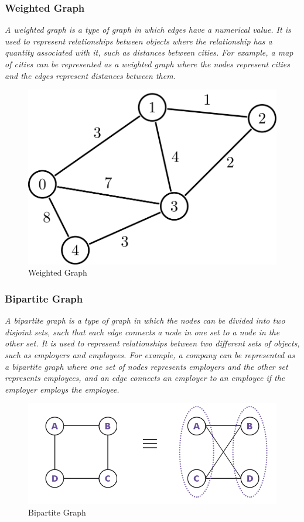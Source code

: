 \documentclass[11pt]{article}
\begin{document}
\subsubsection{Weighted Graph}

\textit{A weighted graph is a type of graph in which edges have a numerical value. It is used to represent relationships between objects where the relationship has a quantity associated with it, such as distances between cities. For example, a map of cities can be represented as a weighted graph where the nodes represent cities and the edges represent distances between them.}

\begin{figure}[H]
    \centering
    \includegraphics[width=.45\textwidth]{figures/weighted graph.png}
    \caption{Weighted Graph}
\end{figure}


\subsubsection{Bipartite Graph}

\textit{A bipartite graph is a type of graph in which the nodes can be divided into two disjoint sets, such that each edge connects a node in one set to a node in the other set. It is used to represent relationships between two different sets of objects, such as employers and employees. For example, a company can be represented as a bipartite graph where one set of nodes represents employers and the other set represents employees, and an edge connects an employer to an employee if the employer employs the employee.}

\begin{figure}[H]
    \centering
    \includegraphics[width=.45\textwidth]{figures/bipartite graph.png}
    \caption{Bipartite Graph}
\end{figure}
\end{document}
